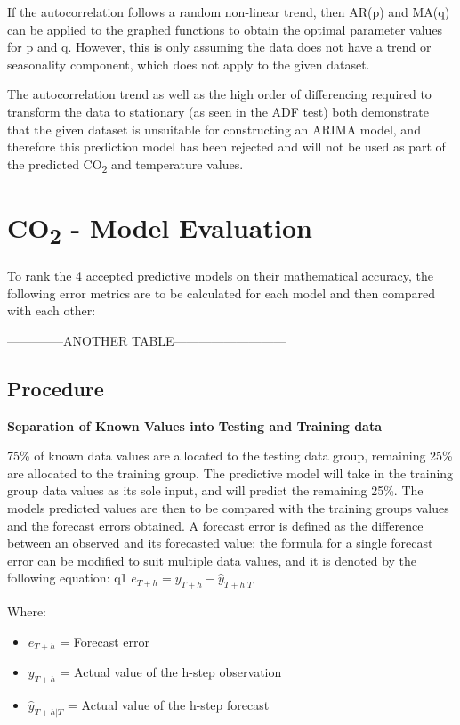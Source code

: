 \documentclass{mcmthesis}
\begin{document}
    If the autocorrelation follows a random non-linear trend, then AR(p) and MA(q) can be applied to the graphed functions to obtain the optimal parameter values for p and q.
    However, this is only assuming the data does not have a trend or seasonality component, which does not apply to the given dataset.

    The autocorrelation trend as well as the high order of differencing required to transform the data to stationary (as seen in the ADF test) both demonstrate that the given dataset is unsuitable for constructing an ARIMA model, and therefore this prediction model has been rejected and will not be used as part of the predicted CO\textsubscript{2} and temperature values.



    \section{CO\textsubscript{2} - Model Evaluation}
    To rank the 4 accepted predictive models on their mathematical accuracy, the following error metrics are to be calculated for each model and then compared with each other:

    --------------ANOTHER TABLE---------------------------

    \subsection{Procedure}
    \noindent \textbf{Separation of Known Values into Testing and Training data}

    75\% of known data values are allocated to the testing data group, remaining 25\% are allocated to the training group. The predictive model will take in the training group data values as its sole input, and will predict the remaining 25\%. The model\textquotesingle s predicted values are then to be compared with the training group\textquotesingle s values and the forecast errors obtained.
    A forecast error is defined as the difference between an observed and its forecasted value; the formula for a single forecast error can be modified to suit multiple data values, and it is denoted by the following equation:
q1
    ${e_{T+h} = y_{T+h} - \hat{y}_{T+h|T}}$

    Where:
    \begin{itemize}
        \item ${e_{T+h}}$ = Forecast error
        \item ${y_{T+h}}$ = Actual value of the h-step observation
        \item ${\hat{y}_{T+h|T}}$ = Actual value of the h-step forecast
    \end{itemize}
\end{document}
